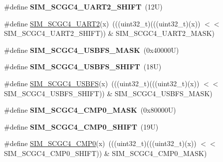 \begin{DoxyCompactItemize}
\#define {\bfseries S\+I\+M\+\_\+\+S\+C\+G\+C4\+\_\+\+U\+A\+R\+T2\+\_\+\+S\+H\+I\+FT}~(12\+U)
\item 
\#define \mbox{\hyperlink{group___s_i_m___register___masks_ga86824f3937c50886253e76d3983a6799}{S\+I\+M\+\_\+\+S\+C\+G\+C4\+\_\+\+U\+A\+R\+T2}}(x)~(((uint32\+\_\+t)(((uint32\+\_\+t)(x)) $<$$<$ S\+I\+M\+\_\+\+S\+C\+G\+C4\+\_\+\+U\+A\+R\+T2\+\_\+\+S\+H\+I\+FT)) \& S\+I\+M\+\_\+\+S\+C\+G\+C4\+\_\+\+U\+A\+R\+T2\+\_\+\+M\+A\+SK)
\item 
\mbox{\label{group___s_i_m___register___masks_ga0a3d8bb24dfab6d8349c5b8ed7fd539f}} 
\#define {\bfseries S\+I\+M\+\_\+\+S\+C\+G\+C4\+\_\+\+U\+S\+B\+F\+S\+\_\+\+M\+A\+SK}~(0x40000\+U)
\item 
\mbox{\label{group___s_i_m___register___masks_ga12840cc6f1ddb70fdb3f54ed759d5844}} 
\#define {\bfseries S\+I\+M\+\_\+\+S\+C\+G\+C4\+\_\+\+U\+S\+B\+F\+S\+\_\+\+S\+H\+I\+FT}~(18\+U)
\item 
\#define \mbox{\hyperlink{group___s_i_m___register___masks_gab81767f7e2f7c78fceef6166c349c141}{S\+I\+M\+\_\+\+S\+C\+G\+C4\+\_\+\+U\+S\+B\+FS}}(x)~(((uint32\+\_\+t)(((uint32\+\_\+t)(x)) $<$$<$ S\+I\+M\+\_\+\+S\+C\+G\+C4\+\_\+\+U\+S\+B\+F\+S\+\_\+\+S\+H\+I\+FT)) \& S\+I\+M\+\_\+\+S\+C\+G\+C4\+\_\+\+U\+S\+B\+F\+S\+\_\+\+M\+A\+SK)
\item 
\mbox{\label{group___s_i_m___register___masks_ga6c98dfbe650659eaaef0eb88ff01a9f5}} 
\#define {\bfseries S\+I\+M\+\_\+\+S\+C\+G\+C4\+\_\+\+C\+M\+P0\+\_\+\+M\+A\+SK}~(0x80000\+U)
\item 
\mbox{\label{group___s_i_m___register___masks_ga806446c88e57ee43e75bdcb3ab22878a}} 
\#define {\bfseries S\+I\+M\+\_\+\+S\+C\+G\+C4\+\_\+\+C\+M\+P0\+\_\+\+S\+H\+I\+FT}~(19\+U)
\item 
\#define \mbox{\hyperlink{group___s_i_m___register___masks_ga5d876e375dcbb96df74e59628815bb76}{S\+I\+M\+\_\+\+S\+C\+G\+C4\+\_\+\+C\+M\+P0}}(x)~(((uint32\+\_\+t)(((uint32\+\_\+t)(x)) $<$$<$ S\+I\+M\+\_\+\+S\+C\+G\+C4\+\_\+\+C\+M\+P0\+\_\+\+S\+H\+I\+FT)) \& S\+I\+M\+\_\+\+S\+C\+G\+C4\+\_\+\+C\+M\+P0\+\_\+\+M\+A\+SK)
\item 
\mbox{\label{group___s_i_m___register___masks_gab32de0f8a4b83a05b226638154da75c0}} 
$$
\end{DoxyCompactItemize}
